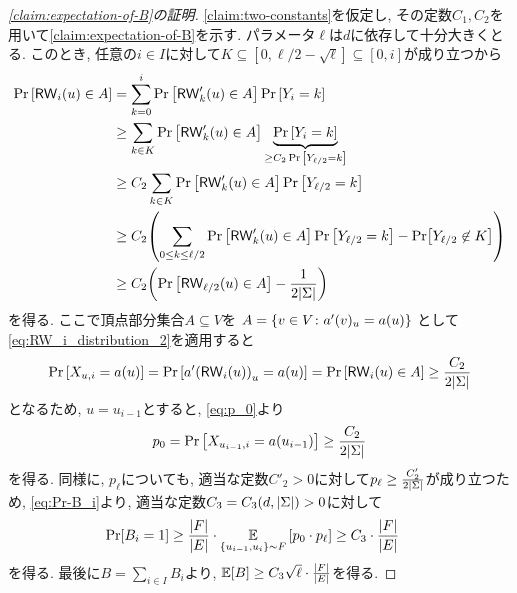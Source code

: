 \begin{proof}[\cref{claim:expectation-of-B}の証明]
  \cref{claim:two-constants}を仮定し, その定数$C_1,C_2$を用いて\cref{claim:expectation-of-B}を示す.
  パラメータ$\ell$は$d$に依存して十分大きくとる.
  このとき, 任意の$i\in I$に対して$K\subseteq [0,\ell/2-\sqrt{\ell}] \subseteq [0,i]$が成り立つから
  \begin{align}
    \Pr\qty[\mathsf{RW}_{i}(u)\in A] &= \sum_{k=0}^{i} \Pr\qty[\mathsf{RW}'_{k}(u) \in A]  \Pr\qty[Y_{i}=k] \nonumber\\
    &\ge \sum_{k\in K} \Pr\qty[\mathsf{RW}'_{k}(u) \in A]  \underbrace{\Pr\qty[Y_{i}=k]}_{\ge C_2 \Pr\qty[Y_{\ell/2}=k]} \nonumber\\
    &\ge C_2 \sum_{k \in K} \Pr\qty[\mathsf{RW}'_{k}(u) \in A]  \Pr\qty[Y_{\ell/2}=k] \nonumber\\
    &\ge C_2 \qty(\sum_{0\le k \le \ell/2} \Pr\qty[\mathsf{RW}'_{k}(u) \in A]  \Pr\qty[Y_{\ell/2}=k] - \Pr[Y_{\ell/2}\not\in K]) \nonumber\\
    &\ge C_2 \qty( \Pr\qty[ \mathsf{RW}_{\ell/2}(u)\in A ] - \frac{1}{2\abs{\Sigma}} ) \label{eq:RW_i_distribution_2}
  \end{align}
  を得る. ここで頂点部分集合$A\subseteq V$を
  $A = \qty{ v \in V \colon a'(v)_u = a(u) }$
  として\cref{eq:RW_i_distribution_2}を適用すると
  \begin{align*}
    \Pr\qty[X_{u,i}=a(u)] = \Pr\qty[ a'\qty(\mathsf{RW}_{i}(u))_u = a(u) ] = \Pr\qty[\mathsf{RW}_{i}(u)\in A] \ge \frac{C_2}{2\abs{\Sigma}}
  \end{align*}
  となるため, $u=u_{i-1}$とすると, \cref{eq:p_0}より
  \begin{align*}
    p_0 = \Pr\qty[X_{u_{i-1},i} = a(u_{i-1})]\ge \frac{C_2}{2\abs{\Sigma}}
  \end{align*}
  を得る.
  同様に, $p_\ell$についても, 適当な定数$C'_2>0$に対して$p_{\ell}\ge \frac{C'_2}{2\abs{\Sigma}}$が成り立つため, \cref{eq:Pr-B_i}より, 適当な定数$C_3=C_3(d,\abs{\Sigma})>0$に対して
  \begin{align*}
    \Pr[B_i=1] &\ge \frac{\abs{F}}{\abs{E}} \cdot \operatorname*{\mathbb{E}}_{\{u_{i-1},u_i\}\sim F}\qty[ p_0 \cdot p_\ell ] \ge C_3\cdot \frac{\abs{F}}{\abs{E}}
  \end{align*}
  を得る. 最後に$B=\sum_{i\in I}B_i$より, $\operatorname*{\mathbb{E}}[B]\ge C_3\sqrt{\ell}\cdot \frac{\abs{F}}{\abs{E}}$を得る.
\end{proof}

